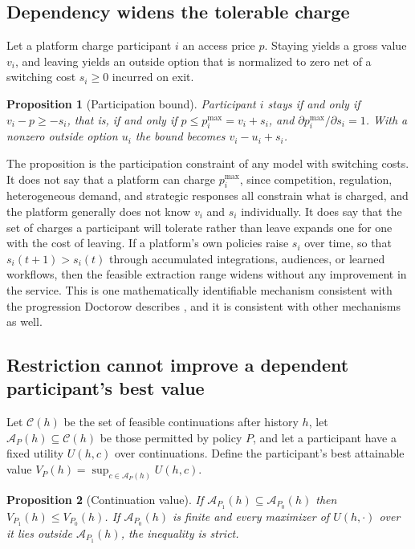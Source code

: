 \documentclass[11pt]{article}
\newtheorem{proposition}{Proposition}
\theoremstyle{definition}
\theoremstyle{remark}
\begin{document}
\subsection{Dependency widens the tolerable charge}

Let a platform charge participant $i$ an access price $p$. Staying yields a gross value $v_i$, and leaving yields an outside option that is normalized to zero net of a switching cost $s_i\ge0$ incurred on exit.

\begin{proposition}[Participation bound]\label{prop:participation}
Participant $i$ stays if and only if $v_i-p\ge -s_i$, that is, if and only if $p\le p_i^{\max}=v_i+s_i$, and $\partial p_i^{\max}/\partial s_i=1$. With a nonzero outside option $u_i$ the bound becomes $v_i-u_i+s_i$.
\end{proposition}

The proposition is the participation constraint of any model with switching costs. It does not say that a platform can charge $p_i^{\max}$, since competition, regulation, heterogeneous demand, and strategic responses all constrain what is charged, and the platform generally does not know $v_i$ and $s_i$ individually. It does say that the set of charges a participant will tolerate rather than leave expands one for one with the cost of leaving. If a platform's own policies raise $s_i$ over time, so that $s_i(t+1)>s_i(t)$ through accumulated integrations, audiences, or learned workflows, then the feasible extraction range widens without any improvement in the service. This is one mathematically identifiable mechanism consistent with the progression Doctorow describes \cite{doctorow}, and it is consistent with other mechanisms as well.

\subsection{Restriction cannot improve a dependent participant's best value}

Let $\mathcal{C}(h)$ be the set of feasible continuations after history $h$, let $\mathcal{A}_P(h)\subseteq\mathcal{C}(h)$ be those permitted by policy $P$, and let a participant have a fixed utility $U(h,c)$ over continuations. Define the participant's best attainable value $V_P(h)=\sup_{c\in\mathcal{A}_P(h)}U(h,c)$.

\begin{proposition}[Continuation value]\label{prop:contvalue}
If $\mathcal{A}_{P_1}(h)\subseteq\mathcal{A}_{P_0}(h)$ then $V_{P_1}(h)\le V_{P_0}(h)$. If $\mathcal{A}_{P_0}(h)$ is finite and every maximizer of $U(h,\cdot)$ over it lies outside $\mathcal{A}_{P_1}(h)$, the inequality is strict.
\end{proposition}
\end{document}
